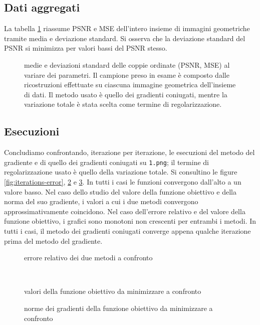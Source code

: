\documentclass[a4paper]{article}
\begin{document}
\subsection{Dati aggregati}
La tabella \ref{fig:aggregation} riassume PSNR e MSE dell'intero insieme di
immagini geometriche tramite media e deviazione standard.
Si osserva che la deviazione standard del PSNR si minimizza per valori bassi del
PSNR stesso.
\begin{figure}[H]
  \begin{center}
    \scalebox{0.65}{}
  \end{center}
  \caption{medie e deviazioni standard delle coppie ordinate (PSNR, MSE) al
  variare dei parametri. Il campione preso in esame è composto dalle
  ricostruzioni effettuate su ciascuna immagine geometrica dell'insieme di
  dati. Il metodo usato è quello dei gradienti coniugati, mentre la variazione
  totale è stata scelta come termine di regolarizzazione.}
  \label{fig:aggregation}
\end{figure}

\subsection{Esecuzioni}
Concludiamo confrontando, iterazione per iterazione, le esecuzioni del metodo
del gradiente e di quello dei gradienti coniugati su \verb!1.png!; il termine di
regolarizzazione usato è quello della variazione totale. Si consultino le figure
\ref{fig:iterations-error}, \ref{fig:iterations-objective} e
\ref{fig:iterations-gradient}. In tutti i casi le funzioni convergono dall'alto
a un valore basso. Nel caso dello studio del valore della funzione obiettivo e
della norma del suo gradiente, i valori a cui i due metodi convergono
approssimativamente coincidono. Nel caso dell'errore relativo e del valore della
funzione obiettivo, i grafici sono monotoni non crescenti per entrambi i metodi.
In tutti i casi, il metodo dei gradienti coniugati converge appena qualche
iterazione prima del metodo del gradiente.
\begin{figure}[H]
  \centering
  \begin{minipage}[t]{0.48\linewidth}
    \centering
    \scalebox{0.4}{}
    \caption{errore relativo dei due metodi a confronto}
    \label{fig:iterations-error}
  \end{minipage}
  \,\,
  \begin{minipage}[t]{0.48\linewidth}
    \centering
    \scalebox{0.4}{}
    \caption{valori della funzione obiettivo da minimizzare a confronto}
    \label{fig:iterations-objective}
  \end{minipage}
\end{figure}
\begin{figure}[H]
  \centering
  \begin{minipage}[t]{0.48\linewidth}
  \scalebox{0.4}{}
  \caption{norme dei gradienti della funzione obiettivo da minimizzare a
    confronto}
  \label{fig:iterations-gradient}
  \end{minipage}
\end{figure}
\end{document}
